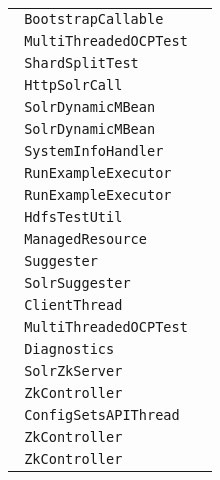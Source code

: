 \begin{center}
\begin{tabular}{ll}
\lstinline/ BootstrapCallable/&\raisebox{0pt}{\lstinline/   Booleancall()/}\\ 
\lstinline/ MultiThreadedOCPTest/&\raisebox{0pt}{\lstinline/   testLongAndShortRunningParallelApiCalls()/}\\ 
\lstinline/ ShardSplitTest/&\raisebox{0pt}{\lstinline/   logDebugHelp(int[]))/}\\ 
\lstinline/ HttpSolrCall/&\raisebox{0pt}{\lstinline/   writeResponse()/}\\ 
\lstinline/ SolrDynamicMBean/&\raisebox{0pt}{\lstinline/   getAttributes(String[])/}\\ 
\lstinline/ SolrDynamicMBean/&\raisebox{0pt}{\lstinline/   getAttributes(String[])/}\\ 
\lstinline/ SystemInfoHandler/&\raisebox{0pt}{\lstinline/   getJvmInfo()/}\\ 
\lstinline/ RunExampleExecutor/&\raisebox{0pt}{\lstinline/   close()/}\\ 
\lstinline/ RunExampleExecutor/&\raisebox{0pt}{\lstinline/   close()/}\\ 
\lstinline/ HdfsTestUtil/&\raisebox{0pt}{\lstinline/   teardownClass(MiniDFSClusterdfsCluster)/}\\ 
\lstinline/ ManagedResource/&\raisebox{0pt}{\lstinline/   doPut(BaseSolrResource)/}\\ 
\lstinline/ Suggester/&\raisebox{0pt}{\lstinline/   SgetSuggestions(SpellingOptions)/}\\ 
\lstinline/ SolrSuggester/&\raisebox{0pt}{\lstinline/   getSuggestions(SuggesterOptions)/}\\ 
\lstinline/ ClientThread/&\raisebox{0pt}{\lstinline/   run()/}\\ 
\lstinline/ MultiThreadedOCPTest/&\raisebox{0pt}{\lstinline/   testLongAndShortRunningParallelApiCalls()/}\\ 
\lstinline/ Diagnostics/&\raisebox{0pt}{\lstinline/   logThreadDumps(Stringmessage)/}\\ 
\lstinline/ SolrZkServer/&\raisebox{0pt}{\lstinline/   start()/}\\ 
\lstinline/ ZkController/&\raisebox{0pt}{\lstinline/   publishNodeAsDown(String)/}\\ 
\lstinline/ ConfigSetsAPIThread/&\raisebox{0pt}{\lstinline/   run()/}\\ 
\lstinline/ ZkController/&\raisebox{0pt}{\lstinline/   publishNodeAsDown(String)/}\\ 
\lstinline/ ZkController/&\raisebox{0pt}{\lstinline/   publishNodeAsDown(String)/}\\ 

\end{tabular}
\end{center}
